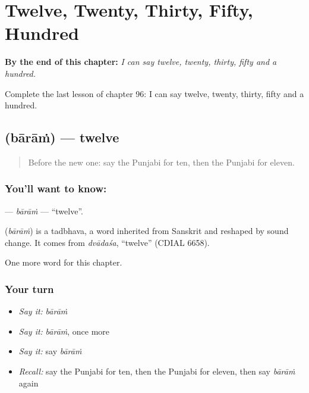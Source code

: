 
\chapter{Twelve, Twenty, Thirty, Fifty, Hundred}
\label{ch:pa-twelve-twenty-thirty-fifty-hundred}

\begin{chapteropening}
\textbf{By the end of this chapter:} \emph{I can say twelve, twenty, thirty, fifty and a hundred.}

Complete the last lesson of chapter 96: I can say twelve, twenty, thirty, fifty and a hundred.
\end{chapteropening}

\section[\texorpdfstring{\pa{ਬਾਰਾਂ} (bārāṁ)}{ਬਾਰਾਂ (bārāṁ)}]{ (bārāṁ) — twelve}

\label{lesson:PA-C96-baram}



\begin{quote}
Before the new one: say the Punjabi for ten, then the Punjabi for eleven.
\end{quote}

\subsection*{You'll want to know: }
\textbf{} — \emph{bārāṁ} — \textquotedblleft{}twelve\textquotedblright{}.

\begin{cousinweb}
\textbf{} (\emph{bārāṁ}) is a tadbhava, a word inherited from Sanskrit and reshaped by sound change. It comes from \emph{dvādaśa}, \textquotedblleft{}twelve\textquotedblright{} (CDIAL 6658).
\end{cousinweb}

\begin{grammarlens}[title={What you've built}]
One more word for this chapter.
\end{grammarlens}

\subsection*{Your turn}
\begin{itemize}
\raggedright
  \item \emph{Say it:} \emph{bārāṁ}
  \item \emph{Say it:} \emph{bārāṁ}, once more
  \item \emph{Say it:} say \emph{bārāṁ}
  \item \emph{Recall:} say the Punjabi for ten, then the Punjabi for eleven, then say \emph{bārāṁ} again
\end{itemize}


